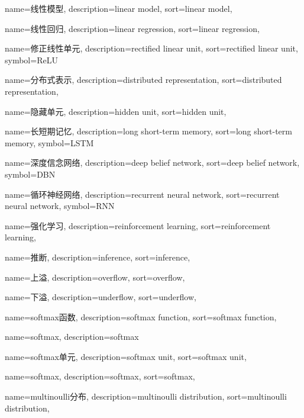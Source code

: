 {
  name=线性模型,
  description={linear model},
  sort={linear model},
}

{
  name=线性回归,
  description={linear regression},
  sort={linear regression},
}

{
  name=修正线性单元,
  description={rectified linear unit},
  sort={rectified linear unit},
  symbol={ReLU}
}

{
  name=分布式表示,
  description={distributed representation},
  sort={distributed representation},
}

{
  name=隐藏单元,
  description={hidden unit},
  sort={hidden unit},
}

{
  name=长短期记忆,
  description={long short-term memory},
  sort={long short-term memory},
  symbol={LSTM}
}

{
  name=深度信念网络,
  description={deep belief network},
  sort={deep belief network},
  symbol={DBN}
}

{
  name=循环神经网络,
  description={recurrent neural network},
  sort={recurrent neural network},
  symbol={RNN}
}

{
  name=强化学习,
  description={reinforcement learning},
  sort={reinforcement learning},
}

{
  name=推断,
  description={inference},
  sort={inference},
}

{
  name=上溢,
  description={overflow},
  sort={overflow},
}

{
  name=下溢,
  description={underflow},
  sort={underflow},
}

{
  name=softmax函数,
  description={softmax function},
  sort={softmax function},
}

{
  name=softmax,
  description={softmax}
}

{
  name=softmax单元,
  description={softmax unit},
  sort={softmax unit},
}

{
  name=softmax,
  description={softmax},
  sort={softmax},
}

{
  name=multinoulli分布,
  description={multinoulli distribution},
  sort={multinoulli distribution},
}

